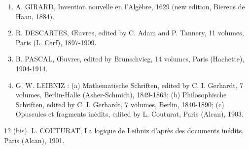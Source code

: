 \begin{enumerate}
\def\labelenumi{\arabic{enumi}.}
\setcounter{enumi}{8}
\item
  A. GIRARD, Invention nouvelle en l'Algèbre, 1629 (new edition, Bierens de Haan, 1884).
\item
  R. DESCARTES, Œuvres, edited by C. Adam and P. Tannery, 11 volumes, Paris (L. Cerf), 1897-1909.
\item
  B. PASCAL, Œuvres, edited by Brunschvicg, 14 volumes, Paris (Hachette), 1904-1914.
\item
  G. W. LEIBNIZ : (a) Mathematische Schriften, edited by C. I. Gerhardt, 7 volumes, Berlin-Halle (Asher-Schmidt), 1849-1863; (b) Philosophische Schriften, edited by C. I. Gerhardt, 7 volumes, Berlin, 1840-1890; (c) Opuscules et fragments inédits, edited by L. Couturat, Paris (Alcan), 1903.
\end{enumerate}

12 (bis). L. COUTURAT, La logique de Leibniz d'après des documents inédits, Paris (Alcan), 1901.

